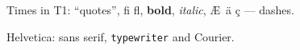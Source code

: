 \documentclass{article}
\begin{document}
Times in T1: ``quotes'', fi fl, \textbf{bold}, \textit{italic}, \AE\ \"a \c{c} --- dashes.

\newpage
Helvetica: \textsf{sans serif}, \texttt{typewriter} and {\selectfont Courier}.
\end{document}
